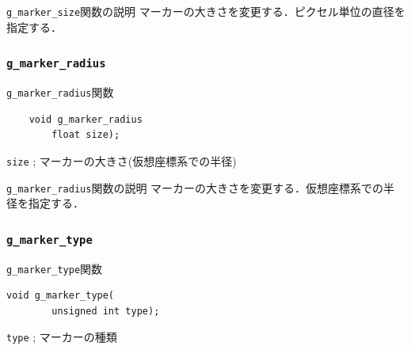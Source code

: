 \documentclass[a4paper,12pt]{jsarticle}%
\begin{document}
\begin{itembox}[l]{\texttt{g\_marker\_size}関数の説明}
	マーカーの大きさを変更する．ピクセル単位の直径を指定する．
\end{itembox}

\subsubsection{\texttt{g\_marker\_radius}}

\begin{itembox}[l]{\texttt{g\_marker\_radius}関数}
	\begin{verbatim}
	void g_marker_radius
        float size);
	\end{verbatim}
	\verb|size| ; マーカーの大きさ(仮想座標系での半径)\\
\end{itembox}

\begin{itembox}[l]{\texttt{g\_marker\_radius}関数の説明}
	マーカーの大きさを変更する．仮想座標系での半径を指定する．
\end{itembox}

\clearpage

\subsubsection{\texttt{g\_marker\_type}}

\begin{itembox}[l]{\texttt{g\_marker\_type}関数}
\begin{verbatim}
void g_marker_type(
        unsigned int type);
\end{verbatim}
\verb|type| ; マーカーの種類\\
\end{itembox}
\end{document}
